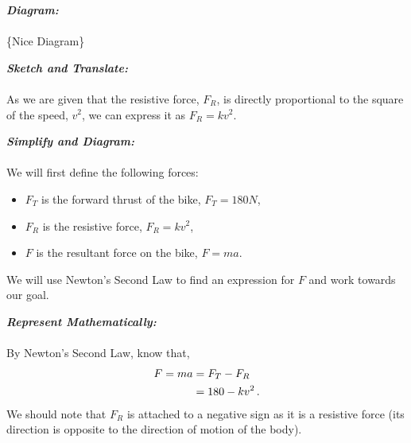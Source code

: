 %
%
%


\begin{subquestions}
	
\subquestion

\textbf{\textit{Diagram:}} \\ \\
\{Nice Diagram\}


\subquestion

\textbf{\textit{Sketch and Translate:}} \\ \\
As we are given that the resistive force, $F_R$, is directly proportional to the square of the speed, $v^2$, we can express it as $F_R=kv^2$.




\textbf{\textit{Simplify and Diagram:}} \\ \\
We will first define the following forces:
\begin{itemize}
	\item $F_T$ is the forward thrust of the bike, $F_T=180N$,
	\item $F_R$ is the resistive force, $F_R=kv^2$,
	\item $F$ is the resultant force on the bike, $F=ma$.
\end{itemize}
We will use Newton's Second Law to find an expression for $F$ and work towards our goal.




\textbf{\textit{Represent Mathematically:}} \\ \\
By Newton's Second Law, know that,
\begin{align}
	F = ma & = F_T - F_R \nonumber \\
           & = 180-kv^2 \,.	\label{2006:q6:FEqn1} 
\end{align}
We should note that $F_R$ is attached to a negative sign as it is a resistive force (its direction is opposite to the direction of motion of the body).


\end{subquestions}

